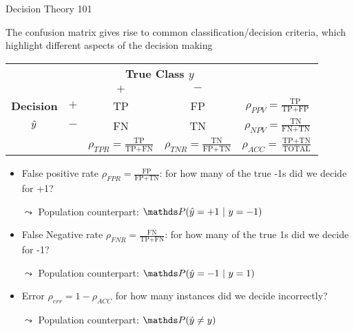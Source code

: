 \documentclass[11pt,compress,t,notes=noshow, xcolor=table]{beamer}
\begin{document}
\begin{vbframe}{Decision Theory 101}
	\footnotesize{
		The confusion matrix gives rise to common classification/decision criteria, which highlight different aspects
		of the decision making
		\begin{center}
			\footnotesize
			\renewcommand{\arraystretch}{1.1}
			\begin{tabular}{cc||cc|c}
				& & \multicolumn{2}{c|}{\bfseries True Class $y$} & \\
				& & $+$ & $-$ & \\ 
				\hline \hline
				\bfseries Decision     & $+$ & TP & FP & $\rho_{PPV} = \frac{\text{TP}}{\text{TP} + \text{FP}}$\\
				$\hat{y}$ & $-$ & FN & TN & $\rho_{NPV} = \frac{\text{TN}}{\text{FN} + \text{TN}}$\\
				\hline
				& & $\rho_{TPR} = \frac{\text{TP}}{\text{TP} + \text{FN}}$ & $\rho_{TNR} = \frac{\text{TN}}{\text{FP} + \text{TN}}$ & $\rho_{ACC} = \frac{\text{TP}+ \text{TN}}{\text{TOTAL}}$
			\end{tabular}
			\renewcommand{\arraystretch}{1}
		\end{center}
		\begin{itemize}
			\item False positive rate $\rho_{FPR} = \frac{\text{FP}}{\text{FP} + \text{TN}}$: for how many of the true -1s did we decide for +1?
			\item [$\leadsto$] Population counterpart: $\P (\yh = +1 ~|~ y= -1)$
			\item False Negative rate $\rho_{FNR} = \frac{\text{FN}}{\text{TP} + \text{FN}}$: for how many of the true 1s did we decide for -1?
			\item [$\leadsto$] Population counterpart: $\P (\yh = -1 ~|~ y= 1)$
			\item Error $\rho_{err} = 1- \rho_{ACC}$ for how many instances did we decide incorrectly?
			\item [$\leadsto$] Population counterpart:  $\P (\yh \neq y  )$
		\end{itemize}
	}
\end{vbframe}
\end{document}
